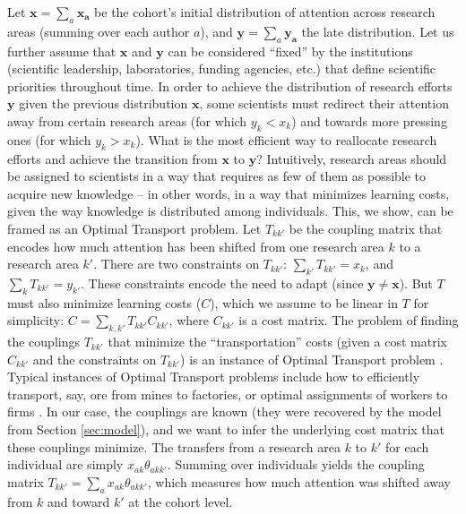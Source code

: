\documentclass{article}
\begin{document}
Let $\bm{x}=\sum_a \bm{x_a}$ be the cohort's initial distribution of attention across research areas (summing over each author $a$), and $\bm{y}=\sum_a \bm{y_a}$ the late distribution. Let us further assume that $\bm{x}$ and $\bm{y}$ can be considered ``fixed'' by the institutions (scientific leadership, laboratories, funding agencies, etc.) that define scientific priorities throughout time. In order to achieve the distribution of research efforts $\bm{y}$ given the previous distribution $\bm{x}$, some scientists must redirect their attention away from certain research areas (for which $y_k<x_k$) and towards more pressing ones (for which $y_k>x_k$). What is the most efficient way to reallocate research efforts and achieve the transition from $\bm{x}$ to $\bm{y}$? Intuitively, research areas should be assigned to scientists in a way that requires as few of them as possible to acquire new knowledge -- in other words, in a way that minimizes learning costs, given the way knowledge is distributed among individuals. This, we show, can be framed as an Optimal Transport problem. Let $T_{kk'}$ be the coupling matrix that encodes how much attention has been shifted from one research area $k$ to a research area $k'$. There are two constraints on $T_{kk'}$: $\sum_{k'} T_{kk'} = x_k$, and $\sum_{k} T_{kk'} = y_{k'}$. These constraints encode the need to adapt (since $\bm{y}\neq \bm{x}$). But $T$ must also minimize learning costs ($C$), which we assume to be linear in $T$ for simplicity: $C=\sum_{k,k'}T_{kk'}C_{kk'}$, where $C_{kk'}$ is a cost matrix. The problem of finding the couplings $T_{kk'}$ that minimize the ``transportation'' costs (given a cost matrix $C_{kk'}$ and the constraints on $T_{kk'}$) is an instance of Optimal Transport problem \citep{Peyr2019}. Typical instances of Optimal Transport problems include how to efficiently transport, say, ore from mines to factories, or optimal assignments of workers to firms \citep{galichon2018optimal}. In our case, the couplings are known (they were recovered by the model from Section \ref{sec:model}), and we want to infer the underlying cost matrix that these couplings minimize. The transfers from a research area $k$ to $k'$ for each individual are simply $x_{ak}\theta_{akk'}$. Summing over individuals yields the coupling matrix $T_{kk'}=\sum_a x_{ak} \theta_{akk'}$, which measures how much attention was shifted away from $k$ and toward $k'$ at the cohort level.
\end{document}
